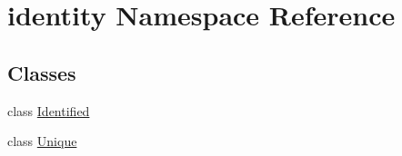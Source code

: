 \hypertarget{namespaceidentity}{}\section{identity Namespace Reference}
\label{namespaceidentity}
\subsection*{Classes}
\begin{DoxyCompactItemize}
\item 
class \hyperlink{classidentity_1_1Identified}{Identified}
\item 
class \hyperlink{classidentity_1_1Unique}{Unique}
\end{DoxyCompactItemize}
